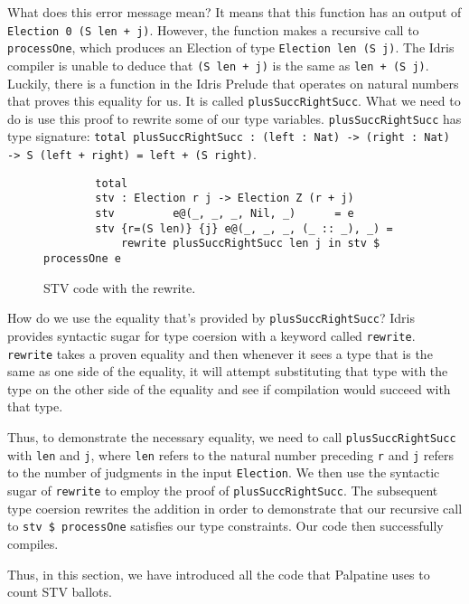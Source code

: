 What does this error message mean? It means that this function has an output of
\texttt{Election 0 (S len + j)}. However, the function makes a recursive call to
\texttt{processOne}, which produces an Election of type \texttt{Election len (S
j)}. The Idris compiler is unable to deduce that \texttt{(S len + j)} is the
same as \texttt{len + (S j)}. Luckily, there is a function in the Idris Prelude
that operates on natural numbers that proves this equality for us. It is called
\texttt{plusSuccRightSucc}. What we need to do is use this proof to rewrite some
of our type variables. \texttt{plusSuccRightSucc} has type signature:
\texttt{total plusSuccRightSucc : (left : Nat) -> (right : Nat) -> S (left +
right) = left + (S right)}. 

\begin{figure}[ht!!!!!!!!]
	\caption{STV code with the rewrite.}
	\label{with_rewrite_code}
	\begin{lstlisting}
        total
        stv : Election r j -> Election Z (r + j)
        stv         e@(_, _, _, Nil, _)      = e
        stv {r=(S len)} {j} e@(_, _, _, (_ :: _), _) = 
            rewrite plusSuccRightSucc len j in stv $ processOne e
    \end{lstlisting}
\end{figure}

How do we use the equality that's provided by \texttt{plusSuccRightSucc}? Idris
provides syntactic sugar for type coersion with a keyword called
\texttt{rewrite}. \texttt{rewrite} takes a proven equality and then whenever it
sees a type that is the same as one side of the equality, it will attempt
substituting that type with the type on the other side of the equality and see
if compilation would succeed with that type. 

Thus, to demonstrate the necessary equality, we need to call
\texttt{plusSuccRightSucc} with \texttt{len} and \texttt{j}, where \texttt{len}
refers to the natural number preceding \texttt{r} and \texttt{j} refers to the
number of judgments in the input \texttt{Election}. We then use the syntactic
sugar of \texttt{rewrite} to employ the proof of \texttt{plusSuccRightSucc}. The
subsequent type coersion rewrites the addition in order to demonstrate that our
recursive call to \texttt{stv \$ processOne} satisfies our type constraints. Our
code then successfully compiles. 

Thus, in this section, we have introduced all the code that Palpatine uses to
count STV ballots. 